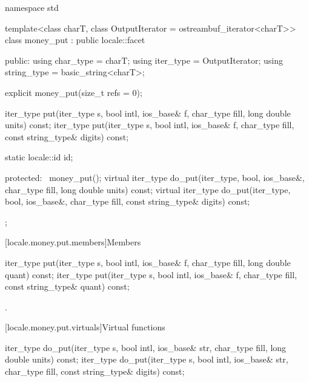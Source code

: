 %
\begin{codeblock}
namespace std {
  template<class charT, class OutputIterator = ostreambuf_iterator<charT>>
    class money_put : public locale::facet {
    public:
      using char_type   = charT;
      using iter_type   = OutputIterator;
      using string_type = basic_string<charT>;

      explicit money_put(size_t refs = 0);

      iter_type put(iter_type s, bool intl, ios_base& f,
                    char_type fill, long double units) const;
      iter_type put(iter_type s, bool intl, ios_base& f,
                    char_type fill, const string_type& digits) const;

      static locale::id id;

    protected:
      ~money_put();
      virtual iter_type do_put(iter_type, bool, ios_base&, char_type fill,
                               long double units) const;
      virtual iter_type do_put(iter_type, bool, ios_base&, char_type fill,
                               const string_type& digits) const;
    };
}
\end{codeblock}

[locale.money.put.members]{Members}

%
\begin{itemdecl}
iter_type put(iter_type s, bool intl, ios_base& f, char_type fill, long double quant) const;
iter_type put(iter_type s, bool intl, ios_base& f, char_type fill, const string_type& quant) const;
\end{itemdecl}

\begin{itemdescr}
\pnum
\returns
{}.
\end{itemdescr}

[locale.money.put.virtuals]{Virtual functions}

%
\begin{itemdecl}
iter_type do_put(iter_type s, bool intl, ios_base& str,
                 char_type fill, long double units) const;
iter_type do_put(iter_type s, bool intl, ios_base& str,
                 char_type fill, const string_type& digits) const;
\end{itemdecl}

